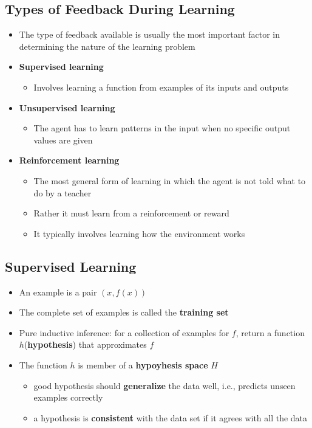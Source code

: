 \documentclass[conference, a4paper]{styles/acmsiggraph}
\begin{document}
    \subsection{Types of Feedback During Learning}
        \begin{itemize}
            \item The type of feedback available is usually the most important factor in determining the nature of the learning problem
            \item \textbf{Supervised learning}
            \begin{itemize}
                \item Involves learning a function from examples of its inputs and outputs
            \end{itemize}
            \item \textbf{Unsupervised learning}
            \begin{itemize}
                \item The agent has to learn patterns in the input when no specific output values are given
            \end{itemize}
            \item \textbf{Reinforcement learning}
            \begin{itemize}
                \item The most general form of learning in which the agent is not told what to do by a teacher
                \item Rather it must learn from a reinforcement or reward
                \item It typically involves learning how the environment works
            \end{itemize}
        \end{itemize}
    
    \subsection{Supervised Learning}
        \begin{itemize}
            \item An example is a pair $(x,f(x))$
            \item The complete set of examples is called the \textbf{training set}
            \item Pure inductive inference: for a collection of examples for $f$, return a function $h$(\textbf{hypothesis}) that approximates $f$
            \item The function $h$ is member of a \textbf{hypoyhesis space} $H$
            \begin{itemize}
                \item good hypothesis should \textbf{generalize} the data well, i.e., predicts unseen examples correctly
                \item a hypothesis is \textbf{consistent} with the data set if it agrees with all the data
            \end{itemize}
        \end{itemize}
    
\end{document}

